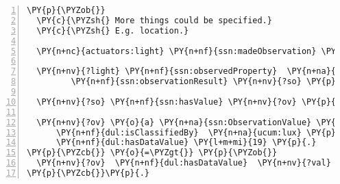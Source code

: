 \expandafter\def\csname PY@tok@err\endcsname{}
{\small
\begin{Verbatim}[commandchars=\\\{\},numbers=left,firstnumber=1,stepnumber=1]
\PY{p}{\PYZob{}}
  \PY{c}{\PYZsh{} More things could be specified.}
  \PY{c}{\PYZsh{} E.g. location.}
  
  \PY{n+nc}{actuators:light} \PY{n+nf}{ssn:madeObservation} \PY{n+nv}{?light} \PY{p}{.}
  
  \PY{n+nv}{?light} \PY{n+nf}{ssn:observedProperty}  \PY{n+na}{sweet:Light} \PY{p}{;}
         \PY{n+nf}{ssn:observationResult} \PY{n+nv}{?so} \PY{p}{.}
  
  \PY{n+nv}{?so} \PY{n+nf}{ssn:hasValue} \PY{n+nv}{?ov} \PY{p}{.}
  
  \PY{n+nv}{?ov} \PY{o}{a} \PY{n+na}{ssn:ObservationValue} \PY{p}{;}
      \PY{n+nf}{dul:isClassifiedBy}  \PY{n+na}{ucum:lux} \PY{p}{;}
      \PY{n+nf}{dul:hasDataValue} \PY{l+m+mi}{19} \PY{p}{.}
\PY{p}{\PYZcb{}} \PY{o}{=\PYZgt{}} \PY{p}{\PYZob{}}
  \PY{n+nv}{?ov}  \PY{n+nf}{dul:hasDataValue}  \PY{n+nv}{?val} \PY{p}{.}
\PY{p}{\PYZcb{}}\PY{p}{.}
\end{Verbatim}
}